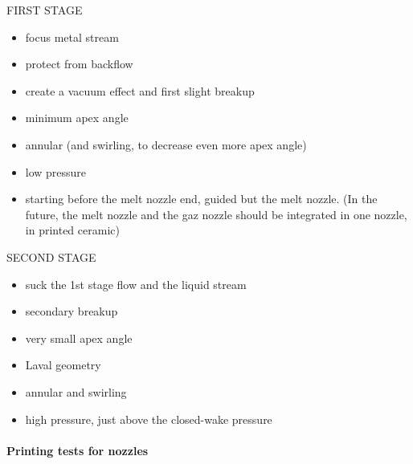 \documentclass[../../main.tex]{subfiles}
\begin{document}
\vspace{0mm}
\begin{minipage}{\linewidth}
    FIRST STAGE
        \begin{itemize}
        \item[$\Rightarrow$] focus metal stream
        \item[$\Rightarrow$] protect from backflow
        \item[$\Rightarrow$] create a vacuum effect and first slight breakup
        \end{itemize}
            \begin{itemize}
            \item minimum apex angle
            \item annular (and swirling, to decrease even more apex angle)
            \item low pressure
            \item starting before the melt nozzle end, guided but the melt nozzle. (In the future, the melt nozzle and the gaz nozzle should be integrated in one nozzle, in printed ceramic)
            \end{itemize}
\end{minipage}
\vspace{5mm}


\vspace{0mm}
\begin{minipage}{\linewidth}
SECOND STAGE
        \begin{itemize}
        \item[$\Rightarrow$] suck the 1st stage flow and the liquid stream
        \item[$\Rightarrow$] secondary breakup
        \end{itemize}
            \begin{itemize}
            \item very small apex angle
            \item Laval geometry
            \item annular and swirling
            \item high pressure, just above the closed-wake pressure
            \end{itemize}
\end{minipage}
\vspace{0mm}


\paragraph{Printing tests for nozzles}
\end{document}
